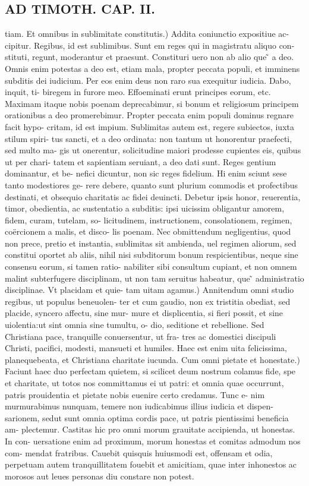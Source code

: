\documentclass{article}
\begin{document}
\begin{pages}
\section*{AD TIMOTH. CAP. II. }
\marginpar{[ p.481 ]}\pstart tiam. Et omnibus in sublimitate constitutis.) Addita coniunctio expositiue ac- cipitur. Regibus, id est sublimibus. Sunt em reges qui in magistratu aliquo con- stituti, regunt, moderantur et praesunt. Constituri uero non ab alio que ̃ a deo. Omnis enim potestas a deo est, etiam mala, propter peccata populi, et imminens subditis dei iudicium. Per eos enim deus non raro sua exequitur iudicia. Dabo, inquit, ti- biregem in furore meo. Effoeminati erunt principes eorum, etc. Maximam itaque  nobis poenam deprecabimur, si bonum et religiosum principem orationibus a deo promerebimur. Propter peccata enim populi dominus regnare facit hypo- critam, id est impium. Sublimitas autem est, regere subiectos, iuxta stilum spiri- tus sancti, et a deo ordinata: non tantum ut honorentur praefecti, sed multo ma- gis ut onerentur, solicitudine maiori prodesse cupientes eis, quibus ut per chari- tatem et sapientiam seruiant, a deo dati sunt. Reges gentium dominantur, et be- nefici dicuntur, non sic reges fidelium. Hi enim sciunt sese tanto modestiores ge- rere debere, quanto sunt plurium commodis et profectibus destinati, et obsequio charitatis ac fidei deuincti. Debetur ipsis honor, reuerentia, timor, obedientia, ac sustentatio a subditis: ipsi uicissim obligantur amorem, fidem, curam, tutelam, so- licitudinem, instructionem, consolationem, regimen, coërcionem a malis, et disco- lis poenam. Nec obmittendum negligentius, quod non prece, pretio et instantia, sublimitas sit ambienda, uel regimen aliorum, sed constitui oportet ab aliis, nihil nisi subditorum bonum respicientibus, neque  sine consensu eorum, si tamen ratio- nabiliter sibi consultum cupiant, et non omnem malint subterfugere disciplinam, ut non tam seruitus habeatur, que ̃ administratio disciplinae. Vt placidam et quie- tam uitam agamus.) Annitendum omni studio regibus, ut populus beneuolen- ter et cum gaudio, non ex tristitia obediat, sed placide, syncero affectu, sine mur- mure et displicentia, si fieri possit, et sine uiolentia:ut sint omnia sine tumultu, o- dio, seditione et rebellione. Sed Christiana pace, tranquille conuersentur, ut fra- tres ac domestici discipuli Christi, pacifici, modesti, mansueti et humiles. Haec est enim uita felicissima, planequebeata, et Christiana charitate iucunda. Cum omni pietate et honestate.) Faciunt haec duo perfectam quietem, si scilicet deum nostrum colamus fide, spe et charitate, ut totos nos committamus ei ut patri: et omnia quae occurrunt, patris prouidentia et pietate nobis euenire certo credamus. Tunc e- nim murmurabimus nunquam, temere non iudicabimus illius iudicia et dispen- sarionem, sedut sunt omnia optima cordis pace, ut patris pientissimi beneficia am- plectemur. Castitas hic pro omni morum grauitate accipienda, ut honestas. In con- uersatione enim ad proximum, morum honestas et comitas admodum nos com- mendat fratribus. Cauebit quisquis huiusmodi est, offensam et odia, perpetuam autem tranquillitatem fouebit et amicitiam, quae inter inhonestos ac morosos aut leues personas diu constare non potest.  \pend

\end{pages}
\end{document}
